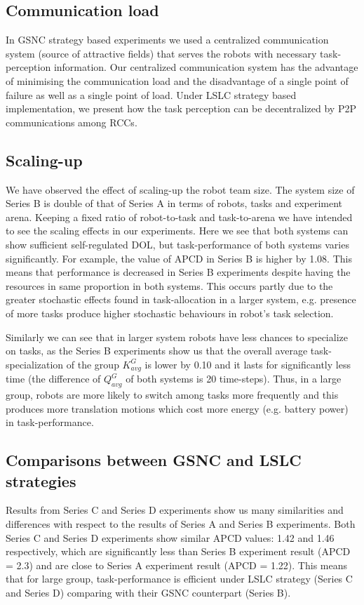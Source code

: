\documentclass[journal]{IEEEtran}
\begin{document}
\subsection{Communication load}
In GSNC strategy based experiments we used a centralized communication system (source of attractive fields) that serves the robots with necessary task-perception information.  Our centralized communication system has the advantage of minimising the communication load and the disadvantage of a single point of failure as well as a single point of load. Under LSLC strategy based implementation, we present how the task perception can be decentralized by P2P communications among RCCs.
\subsection{Scaling-up}
We have observed the effect of scaling-up the robot team size. The system size of Series B is double of that of Series A in terms of robots, tasks and experiment arena. Keeping a fixed ratio of robot-to-task and task-to-arena we have intended to see the scaling effects in our experiments. Here we see that both systems can show sufficient self-regulated DOL, but task-performance of both systems varies significantly. For example, the value of APCD in Series B is higher by 1.08. This means that performance  is decreased in Series B experiments despite having the resources in same proportion in both systems. This occurs partly due to the greater stochastic effects found in task-allocation in a larger system, e.g. presence of more tasks produce higher stochastic behaviours in robot's task selection.

Similarly we can see that in larger system robots have less chances to specialize on tasks, as the Series B experiments show us that the overall average task-specialization of the group $K^G_{avg}$ is lower by 0.10 and it lasts for significantly less time (the difference of $Q^G_{avg}$  of both systems is 20 time-steps). Thus, in a large group, robots are more likely to switch among tasks more frequently and this produces more translation motions which cost more energy (e.g. battery power) in task-performance.
\subsection{Comparisons between GSNC and LSLC strategies} 
Results from Series C and Series D experiments show us many similarities and differences with respect to the results of Series A and Series B experiments. Both Series C and Series D experiments show similar APCD values: 1.42 and 1.46 respectively, which are significantly less than Series B experiment result (APCD = 2.3) and are close to Series A experiment result (APCD = 1.22). This means that for large group, task-performance  is efficient under LSLC strategy (Series C and Series D) comparing with their GSNC counterpart (Series B).
\end{document}
